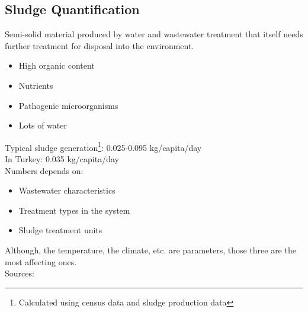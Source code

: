 \documentclass[12pt]{article}
\begin{document}
\subsection{Sludge Quantification}
Semi-solid material produced by water and wastewater treatment that itself needs further treatment for disposal into the environment.
\begin{itemize}
    \item High organic content
    \item Nutrients
    \item Pathogenic microorganisms
    \item Lots of water
\end{itemize}
Typical sludge generation\footnote{Calculated using census data and sludge production data}: 0.025-0.095 kg/capita/day\\
In Turkey: 0.035 kg/capita/day\\
Numbers depends on:
\begin{itemize}
    \item Wastewater characteristics
    \item Treatment types in the system
    \item Sludge treatment units
\end{itemize}
Although, the temperature, the climate, etc. are parameters, those three are the most affecting ones.\\
Sources:
\end{document}
